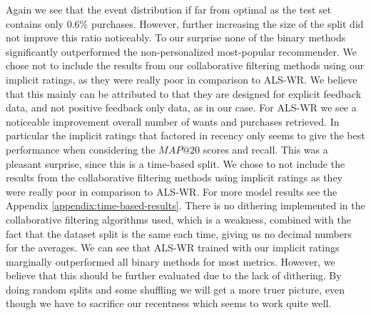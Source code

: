 {\begin{table}[H]
{
    }
    \caption{Time-based split results (16. April - 19. May). All scores are averaged over 5-10 runs}
    \end{table}
}

\timeBasedSplit{\reducedTableView}


Again we see that the event distribution if far from optimal as the test set contains only $0.6\%$ purchases. However, further increasing the
size of the split did not improve this ratio noticeably. To our surprise none of the binary methods significantly outperformed the non-personalized most-popular
recommender. We chose not to include the results from our collaborative filtering methods using our implicit ratings, as they were really poor in comparison to ALS-WR.
We believe that this mainly can be attributed to that they are designed for explicit feedback data, and not positive feedback only data, as in our case.
For ALS-WR we see a noticeable improvement overall number of wants and purchases retrieved. In particular the implicit ratings that factored in recency only seems
to give the best performance when considering the $MAP@20$ scores and recall. This was a pleasant surprise, since this is a time-based split. We chose to
not include the results from the collaborative filtering methods using implicit ratings as they were really poor in comparison to ALS-WR. For more model results
see the Appendix \ref{appendix:time-based-results}.
There is no dithering implemented in the collaborative filtering algorithms used, which is a weakness, combined with the fact that the dataset split is the same
each time, giving us no decimal numbers for the averages. We can see that ALS-WR trained with our implicit ratings marginally outperformed all binary methods for
most metrics. However, we believe that this should be further evaluated due to the lack of dithering. By doing random splits and some shuffling we will get a more
truer picture, even though we have to sacrifice our recentness which seems to work quite well.

